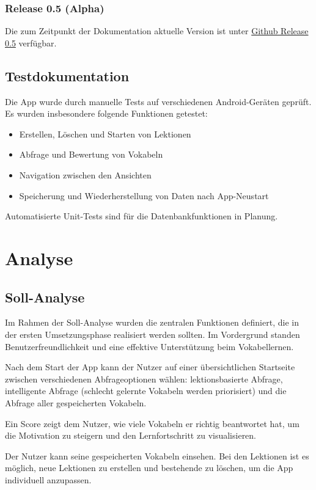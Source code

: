 \documentclass[12pt,a4paper]{article}
\begin{document}
\subsubsection{Release 0.5 (Alpha)}
Die zum Zeitpunkt der Dokumentation aktuelle Version ist unter \href{https://github.com/Erik-Donath/Palabra/releases/tag/0.5}{Github Release 0.5} verfügbar.

\subsection{Testdokumentation}
Die App wurde durch manuelle Tests auf verschiedenen Android-Geräten geprüft. Es wurden insbesondere folgende Funktionen getestet:
\begin{itemize}
\item Erstellen, Löschen und Starten von Lektionen
\item Abfrage und Bewertung von Vokabeln
\item Navigation zwischen den Ansichten
\item Speicherung und Wiederherstellung von Daten nach App-Neustart
\end{itemize}
Automatisierte Unit-Tests sind für die Datenbankfunktionen in Planung.

\section{Analyse}

\subsection{Soll-Analyse}
Im Rahmen der Soll-Analyse wurden die zentralen Funktionen definiert, die in der ersten Umsetzungsphase realisiert werden sollten. Im Vordergrund standen Benutzerfreundlichkeit und eine effektive Unterstützung beim Vokabellernen.

Nach dem Start der App kann der Nutzer auf einer übersichtlichen Startseite zwischen verschiedenen Abfrageoptionen wählen: lektionsbasierte Abfrage, intelligente Abfrage (schlecht gelernte Vokabeln werden priorisiert) und die Abfrage aller gespeicherten Vokabeln.

Ein Score zeigt dem Nutzer, wie viele Vokabeln er richtig beantwortet hat, um die Motivation zu steigern und den Lernfortschritt zu visualisieren.

Der Nutzer kann seine gespeicherten Vokabeln einsehen. Bei den Lektionen ist es möglich, neue Lektionen zu erstellen und bestehende zu löschen, um die App individuell anzupassen.
\end{document}
